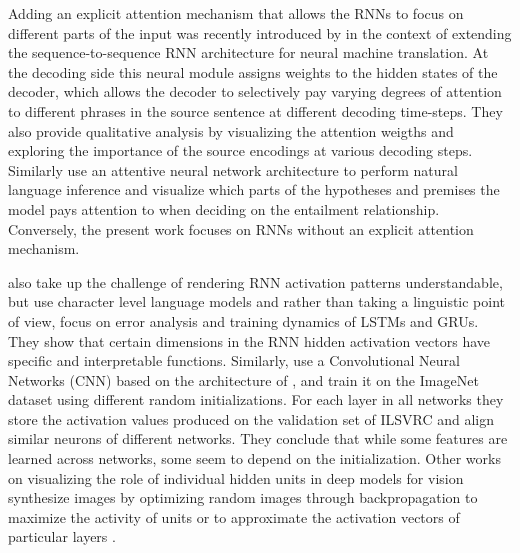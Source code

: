 Adding an explicit attention mechanism that allows the RNNs to focus on \label{edit:attention}
different parts of the input was recently introduced by 
in the context of extending the sequence-to-sequence 
RNN architecture for neural machine translation. 
At the decoding side this neural module assigns weights 
to the hidden states of the decoder, which allows the decoder to selectively pay varying degrees of
attention to different phrases in the source sentence at different decoding time-steps.
They also provide qualitative analysis by visualizing the attention
weigths and exploring the importance of the source encodings at various decoding steps.
Similarly  use an attentive neural 
network architecture to perform natural language inference and visualize which parts
of the hypotheses and premises the model pays attention to when deciding on the 
entailment relationship. Conversely, the present work focuses on RNNs without an 
explicit attention mechanism.

 also take up the challenge of
rendering RNN activation patterns understandable, but use character
level language models and rather than taking a linguistic point of
view, focus on error analysis and training dynamics of LSTMs and
GRUs.  They show that certain dimensions in the RNN hidden activation
vectors have specific and interpretable functions. Similarly,
 use a Convolutional Neural Networks (CNN)
based on the architecture of , 
and train it on the ImageNet dataset using different random initializations. For each layer
in all networks they store the activation values produced on the
validation set of ILSVRC and align similar neurons of different
networks. They conclude that while some features are learned across
networks, some seem to depend on the initialization. Other works on
visualizing the role of individual hidden units in deep models for vision
synthesize images by optimizing random images through backpropagation
to maximize the activity of units
\cite{erhan2009visualizing,simonyan2013deep,yosinski2015understanding,nguyen2016multifaceted}
or to approximate the activation vectors of particular layers
\cite{mahendran2015visualizing,dosovitskiy2015inverting}.

